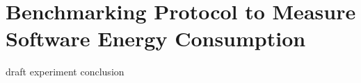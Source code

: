 
\chapter{Benchmarking Protocol to Measure Software Energy Consumption}\label{chapter:benchmarking}

{draft}
{experiment}
{conclusion}

